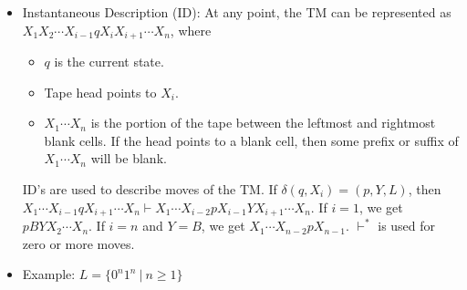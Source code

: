 \documentclass{article}
\begin{document}
\begin{sloppypar}
\begin{itemize}
        \item Instantaneous Description (ID): At any point, the TM can be represented as $X_1X_2\cdots X_{i-1}qX_iX_{i+1}\cdots X_n$, where
        \begin{itemize}
            \item $q$ is the current state.
            \item Tape head points to $X_i$.
            \item $X_1\cdots X_n$ is the portion of the tape between the leftmost and rightmost blank cells. If the head points to a blank cell, then some prefix or suffix of $X_1\cdots X_n$ will be blank.
        \end{itemize}
        ID's are used to describe moves of the TM. If $\delta(q,X_i) = (p,Y,L)$, then $X_1\cdots X_{i-1}qX_{i+1}\cdots X_n \vdash X_1\cdots X_{i-2}pX_{i-1}YX_{i+1}\cdots X_n$. If $i=1$, we get $pBYX_2\cdots X_n$. If $i=n$ and $Y=B$, we get $X_1\cdots X_{n-2}pX_{n-1}$. $\vdash^*$ is used for zero or more moves.

        \item Example: $L = \{0^n1^n\ |\ n\ge1\}$
        
        \begin{minipage}{\linewidth}

            \centering

\end{minipage}
\end{itemize}
\end{sloppypar}
\end{document}
